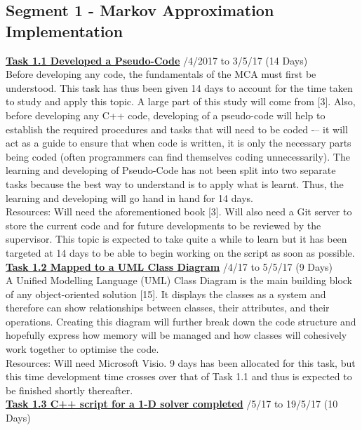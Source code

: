 \documentclass[11pt,draftd]{article}
\begin{document}
\begin{appendices}
	\subsection{Segment 1 - Markov Approximation Implementation}
	\underline{\textbf{Task 1.1 Developed a Pseudo-Code}} /4/2017 to 3/5/17 (14 Days) \\
	
	Before developing any code, the fundamentals of the MCA must first be understood. This task has thus been given 14 days to account for the time taken to study and apply this topic. A large part of this study will come from [3]. Also, before developing any C++ code, developing of a pseudo-code will help to establish the required procedures and tasks that will need to be coded -– it will act as a guide to ensure that when code is written, it is only the necessary parts being coded (often programmers can find themselves coding unnecessarily). 
	The learning and developing of Pseudo-Code has not been split into two separate tasks because the best way to understand is to apply what is learnt. Thus, the learning and developing will go hand in hand for 14 days. \\
	Resources: Will need the aforementioned book [3]. Will also need a Git server to store the current code and for future developments to be reviewed by the supervisor. This topic is expected to take quite a while to learn but it has been targeted at 14 days to be able to begin working on the script as soon as possible. \\
		
	\noindent\underline{\textbf{Task 1.2 Mapped to a UML Class Diagram}} /4/17 to 5/5/17 (9 Days) \\
	
	A Unified Modelling Language (UML) Class Diagram is the main building block of any object-oriented solution [15]. It displays the classes as a system and therefore can show relationships between classes, their attributes, and their operations. Creating this diagram will further break down the code structure and hopefully express how memory will be managed and how classes will cohesively work together to optimise the code. \\
	Resources: Will need Microsoft Visio. 9 days has been allocated for this task, but this time development time crosses over that of Task 1.1 and thus is expected to be finished shortly thereafter. \\
	
		
	\noindent\underline{\textbf{Task 1.3 C++ script for a 1-D solver completed}} /5/17 to 19/5/17 (10 Days) \\
	

\end{appendices}
\end{document}
